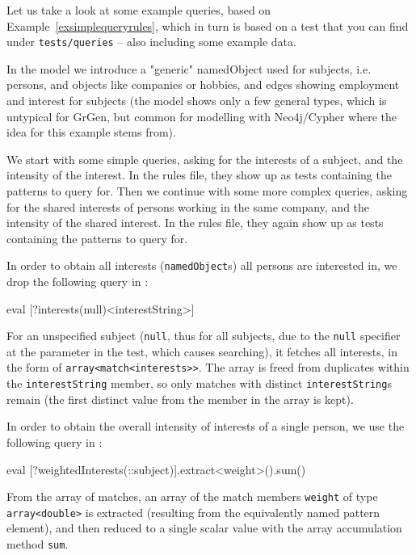 \begin{example}\label{exsimplequery}

Let us take a look at some example queries, based on Example~\ref{exsimplequeryrules}, which in turn is based on a test that you can find under \texttt{tests/queries} -- also including some example data.

In the model we introduce a "generic" namedObject used for subjects, i.e. persons, and objects like companies or hobbies, and edges showing employment and interest for subjects (the model shows only a few general types, which is untypical for GrGen, but common for modelling with Neo4j/Cypher where the idea for this example stems from).

We start with some simple queries, asking for the interests of a subject, and the intensity of the interest.
In the rules file, they show up as tests containing the patterns to query for.
Then we continue with some more complex queries, asking for the shared interests of persons working in the same company, and the intensity of the shared interest.
In the rules file, they again show up as tests containing the patterns to query for.

\vspace{3mm}

In order to obtain all interests (\texttt{namedObject}s) all persons are interested in, we drop the following query in \GrShell:

	\begin{grshell}
eval [?interests(null)\keepOneForEach<interestString>]
  \end{grshell}

For an unspecified subject (\texttt{null}, thus for all subjects, due to the \texttt{null} specifier at the parameter in the test, which causes searching), it fetches all interests, in the form of \texttt{array<match<interests>>}. The array is freed from duplicates within the \texttt{interestString} member, so only matches with distinct \texttt{interestString}s remain (the first distinct value from the member in the array is kept).

In order to obtain the overall intensity of interests of a single person, we use the following query in \GrShell:

	\begin{grshell}
eval [?weightedInterests(::subject)].extract<weight>().sum()
  \end{grshell}

From the array of matches, an array of the match members \texttt{weight} of type \texttt{array<double>} is extracted (resulting from the equivalently named pattern element), and then reduced to a single scalar value with the array accumulation method \texttt{sum}.


\end{example}
